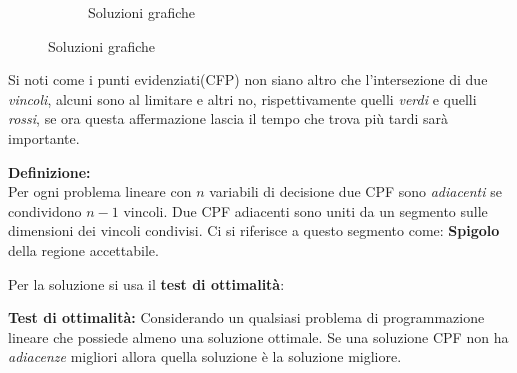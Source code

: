 \documentclass{article}
\begin{document}
\begin{figure}[ht]
\begin{subfigure}[b]{0.45\textwidth}
\begin{tikzpicture}
          \end{tikzpicture}
          \caption{Soluzioni grafiche}
        \end{subfigure}

      \end{figure}

      Si noti come i punti evidenziati(CFP) non siano altro che l'intersezione di due \textit{vincoli}, alcuni sono al limitare e altri no, rispettivamente quelli \textit{verdi} e quelli \textit{rossi}, se ora questa affermazione lascia il tempo che trova più tardi sarà importante.
      
      \begin{tcolorbox}
        \textbf{Definizione:} \\
        Per ogni problema lineare con $n$ variabili di decisione due CPF sono \textit{adiacenti} se condividono $n-1$ vincoli. Due CPF adiacenti sono uniti da un segmento sulle dimensioni dei vincoli condivisi. Ci si riferisce a questo segmento come: \textbf{Spigolo} della regione accettabile.
      \end{tcolorbox}
    
      Per la soluzione si usa il \textbf{test di ottimalità}:

      \begin{tcolorbox}
        \textbf{Test di ottimalità:}
        Considerando un qualsiasi problema di programmazione lineare che possiede almeno una soluzione ottimale. Se una soluzione CPF non ha \textit{adiacenze} migliori allora quella soluzione è la soluzione migliore.
      \end{tcolorbox}
\end{document}

